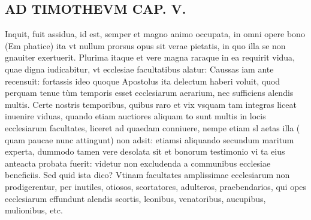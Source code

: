 \documentclass{article}
\begin{document}
\begin{pages}
\section*{AD TIMOTHEVM CAP. V. }
\marginpar{[ p.109 ]}\pstart Inquit, fuit assidua, id est, semper et magno animo occupata, in omni opere bono (Em phatice) ita vt nullum prorsus opus sit verae pietatis, in quo illa se non gnauiter exertuerit. Plurima itaque et vere magna raraque in ea requirit vidua, quae digna iudicabitur, vt ecclesiae facultatibus alatur: Caussas iam ante recensuit: fortassis ideo quoque Apostolus ita delectum haberi voluit, quod perquam tenue tùm temporis esset ecclesiarum aerarium, nec sufficiens alendis multis. Certe nostris temporibus, quibus raro et vix vsquam tam integras liceat inuenire viduas, quando etiam auctiores aliquam to sunt multis in locis ecclesiarum facultates, liceret ad quaedam conniuere, nempe etiam sl aetas illa ( quam paucae nunc attingunt) non adsit: etiamsi aliquando secundum maritum experta, dummodo tamen vere desolata sit et bonorum testimonio vi ta eius anteacta probata fuerit: videtur non excludenda a communibus ecclesiae beneficiis. Sed quid ista dico? Vtinam facultates amplissimae ecclesiarum non prodigerentur, per inutiles, otiosos, scortatores, adulteros, praebendarios, qui opes ecclesiarum effundunt alendis scortis, leonibus, venatoribus, aucupibus, mulionibus, etc.  \pend
{}
{}

\end{pages}
\end{document}
